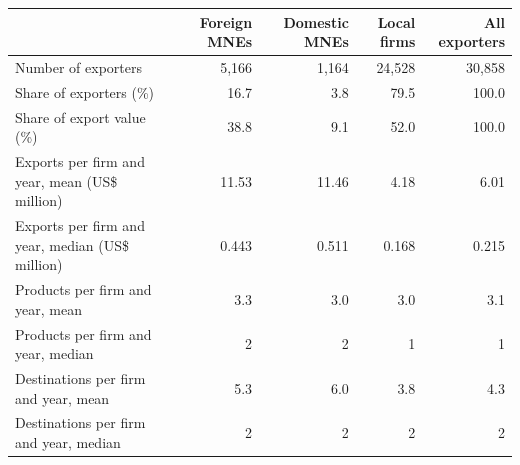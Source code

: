 \begin{tabular}{lrrrr}
\toprule
 & Foreign MNEs & Domestic MNEs & Local firms & All exporters \\
\midrule
Number of exporters & 5,166 & 1,164 & 24,528 & 30,858 \\
Share of exporters (\%) & 16.7 & 3.8 & 79.5 & 100.0 \\
Share of export value (\%) & 38.8 & 9.1 & 52.0 & 100.0 \\
Exports per firm and year, mean (US\$ million) & 11.53 & 11.46 & 4.18 & 6.01 \\
Exports per firm and year, median (US\$ million) & 0.443 & 0.511 & 0.168 & 0.215 \\
Products per firm and year, mean & 3.3 & 3.0 & 3.0 & 3.1 \\
Products per firm and year, median & 2 & 2 & 1 & 1 \\
Destinations per firm and year, mean & 5.3 & 6.0 & 3.8 & 4.3 \\
Destinations per firm and year, median & 2 & 2 & 2 & 2 \\
\bottomrule
\end{tabular}
